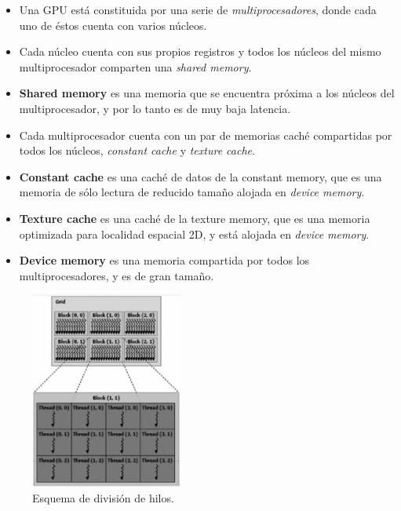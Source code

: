 \begin{itemize}
	\item Una GPU está constituida por una serie de \textit{multiprocesadores}, donde cada uno de éstos cuenta con varios núcleos.

	\item Cada núcleo cuenta con sus propios registros y todos los núcleos del mismo multiprocesador comparten una \textit{shared memory}.

	\item \textbf{Shared memory} es una memoria que se encuentra próxima a los núcleos del multiprocesador, y por lo tanto es de muy baja latencia.
	
	\item Cada multiprocesador cuenta con un par de memorias caché compartidas por todos los núcleos, \textit{constant cache} y \textit{texture cache}.

	\item \textbf{Constant cache} es una caché de datos de la constant memory, que es una memoria de sólo lectura de reducido tamaño alojada en \textit{device memory}.

	\item \textbf{Texture cache} es una caché de la texture memory, que es una memoria optimizada para localidad espacial 2D, y está alojada en \textit{device memory}.

	\item \textbf{Device memory} es una memoria compartida por todos los multiprocesadores, y es de gran tamaño.

\end{itemize}


\begin{figure}
\begin{center}
   \includegraphics[width=5cm]{fig/threads.png}
\end{center}
\caption{\label{fig:hilos}Esquema de división de hilos.}
\end{figure}

